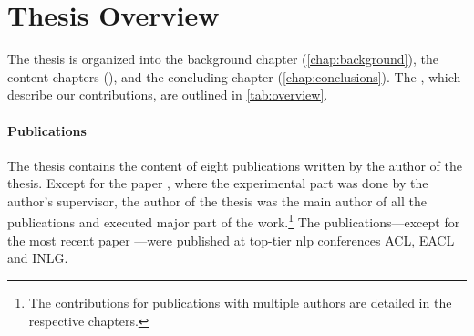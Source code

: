 \section{Thesis Overview}
\label{sec:overview}

The thesis is organized into the background chapter (\autoref{chap:background}), the content chapters (), and the concluding chapter (\autoref{chap:conclusions}). The , which describe our contributions, are outlined in \autoref{tab:overview}.

\paragraph{Publications} The thesis contains the content of eight publications written by the author of the thesis. Except for the paper \citet{dusekEvaluatingSemanticAccuracy2020}, where the experimental part was done by the author's supervisor, the author of the thesis was the main author of all the publications and executed major part of the work.\footnote{The contributions for publications with multiple authors are detailed in the respective chapters.} The publications---except for the most recent paper \citet{kasnerReferenceBasedMetricsAnalyzing2024}---were published at top-tier \ac{nlp} conferences ACL, EACL and INLG.

